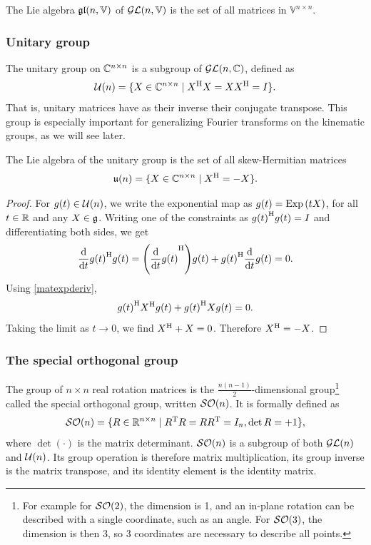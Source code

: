 \documentclass[../../main.tex]{subfiles}
\begin{document}
\begin{refsection}
	The Lie algebra $\mathfrak{gl} (n, \mathbb{V})$ of $\mathcal{GL} (n, \mathbb{V})$ is the set of all matrices in $\mathbb{V}^{n \times n}$.

	\subsubsection{Unitary group}

	The unitary group on $\mathbb{C}^{n \times n}$ is a subgroup of $\mathcal{GL} (n, \mathbb{C})$, defined as
	$$\mathcal{U}(n) = \{X \in \mathbb{C}^{n \times n} \mid {X}^\mathrm{H} X = X {X}^\mathrm{H} = I \}.$$
	That is, unitary matrices have as their inverse their conjugate transpose.
	This group is especially important for generalizing Fourier transforms on the kinematic groups, as we will see later.

	\begin{theorem} \label{liealgunitaryisskewherm}
		The Lie algebra of the unitary group is the set of all skew-Hermitian matrices
		$$\mathfrak{u}(n) = \{X \in \mathbb{C}^{n \times n} \mid {X}^\mathrm{H} = -X \}.$$
	\end{theorem}
	\begin{proof}
		For $g(t) \in \mathcal{U}(n)$, we write the exponential map as $g(t) = \operatorname{Exp}\qty(t X)$, for all $t \in \mathbb{R}$ and any $X \in \mathfrak{g}$.
		Writing one of the constraints as ${g(t)}^\mathrm{H} g(t) = I$ and differentiating both sides, we get
		$$
			\dv{t} \hconj{g(t)} g(t)
			= \qty( \hconj{\dv{t} g(t)} ) g(t) + \hconj{g(t)} \dv{t} g(t) = 0.
		$$
		Using \cref{matexpderiv},
		$${g(t)}^\mathrm{H} {X}^\mathrm{H} g(t) + {g(t)}^\mathrm{H} X g(t) = 0.$$
		Taking the limit as $t \to 0$, we find ${X}^\mathrm{H} + X = 0$.
		Therefore ${X}^\mathrm{H} = -X$.
	\end{proof}

	\subsubsection{The special orthogonal group}\label{the-special-orthogonal-group}

	The group of $n \times n$ real rotation matrices is the $\frac{n(n-1)}{2}$-dimensional group\footnote{
		For example for $\mathcal{SO} (2)$, the dimension is 1, and an in-plane rotation can be described with a single coordinate, such as an angle.
		For $\mathcal{SO} (3)$, the dimension is then 3, so 3 coordinates are necessary to describe all points.
	} called the special orthogonal group, written $\mathcal{SO} (n)$.
	It is formally defined as
	\[\SO{n}=\{\mat{R} \in \bbR^{n \times n} \mid \trans{\mat{R}} \mat{R} = \mat{R} \trans{\mat{R}} = \mat{I}_n, \det\mat{R} = +1 \},\]
	where $\det(\cdot)$ is the matrix determinant.
	$\mathcal{SO} (n)$ is a subgroup of both $\mathcal{GL} (n)$ and $\mathcal{U}(n)$.
	Its group operation is therefore matrix multiplication, its group inverse is the matrix transpose, and its identity element is the identity matrix.


\end{refsection}
\end{document}
